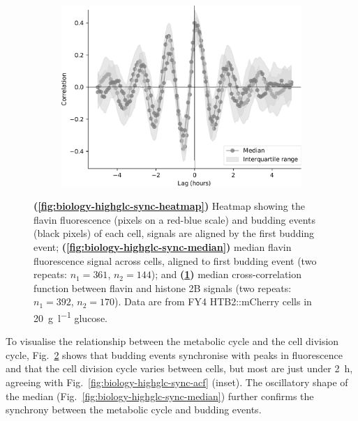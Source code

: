 \begin{figure}
  \begin{subfigure}[htpb]{0.7\textwidth}
   \centering
   \includegraphics[width=\textwidth]{xcf_highglcreps.pdf}
   \caption{
   }
   \label{fig:biology-highglc-sync-xcf}
  \end{subfigure}

  \caption{
    \textbf{(\ref{fig:biology-highglc-sync-heatmap})}
    Heatmap showing the flavin fluorescence (pixels on a red-blue scale) and budding events (black pixels) of each cell,
    signals are aligned by the first budding event;
    \textbf{(\ref{fig:biology-highglc-sync-median})}
    median flavin fluorescence signal across cells, aligned to first budding event (two repeats: $n_{1}=361$, $n_{2}=144$); and
    \textbf{(\ref{fig:biology-highglc-sync-xcf})}
    median cross-correlation function between flavin and histone 2B signals (two repeats: $n_{1}=392$, $n_{2}=170$).
    Data are from FY4 HTB2::mCherry cells in \SI{20}{\gram~\litre^{-1}} glucose.
  }
  \label{fig:biology-highglc-sync-corr}
\end{figure}

To visualise the relationship between the metabolic cycle and the cell division cycle,
Fig.\ \ref{fig:biology-highglc-sync-corr} shows that
budding events synchronise with peaks in fluorescence and
that the cell division cycle varies between cells,
but most are just under \SI{2}{\hour}, agreeing with Fig.\ \ref{fig:biology-highglc-sync-acf} (inset).
The oscillatory shape of the median (Fig.\ \ref{fig:biology-highglc-sync-median}) further confirms the synchrony between the metabolic cycle and budding events.

